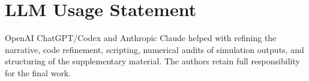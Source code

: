 \section*{LLM Usage Statement}
OpenAI ChatGPT/Codex and Anthropic Claude helped with refining the narrative, code refinement, scripting, numerical audits of simulation outputs, and structuring of the supplementary material. The authors retain full responsibility for the final work.
